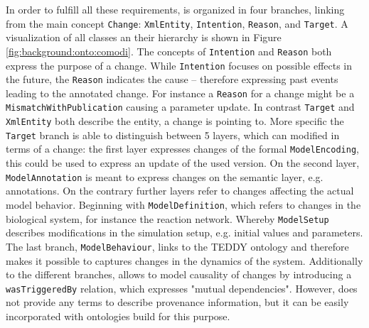 	In order to fulfill all these requirements, \comodi is organized in four branches, linking from the main concept \texttt{Change}: \texttt{XmlEntity}, \texttt{Intention}, \texttt{Reason}, and \texttt{Target}. A visualization of all classes an their hierarchy is shown in Figure \ref{fig:background:onto:comodi}.
	The concepts of \texttt{Intention} and \texttt{Reason} both express the purpose of a change. While \texttt{Intention} focuses on possible effects in the future, the \texttt{Reason} indicates the cause -- therefore expressing past events leading to the annotated change. For instance a \texttt{Reason} for a change might be a \texttt{MismatchWithPublication} causing a parameter update.
	In contrast \texttt{Target} and \texttt{XmlEntity} both describe the entity, a change is pointing to.
	More specific the \texttt{Target} branch is able to distinguish between 5 layers, which can modified in terms of a change: the first layer expresses changes of the formal \texttt{ModelEncoding}, this could be used to express an update of the used \sbml version.
	On the second layer, \texttt{ModelAnnotation} is meant to express changes on the semantic layer, e.g. annotations. 
	On the contrary further layers refer to changes affecting the actual model behavior. Beginning with \texttt{ModelDefinition}, which refers to changes in the biological system, for instance the reaction network. Whereby \texttt{ModelSetup} describes modifications in the simulation setup, e.g. initial values and parameters. The last branch, \texttt{ModelBehaviour}, links to the TEDDY ontology \citep{Courtot2011} and therefore makes it possible to captures changes in the dynamics of the system.
	Additionally to the different branches, \comodi allows to model causality of changes by introducing a \texttt{wasTriggeredBy} relation, which expresses "mutual dependencies". However, \comodi does not provide any terms to describe provenance information, but it can be easily incorporated with ontologies build for this purpose.
	
	
	

